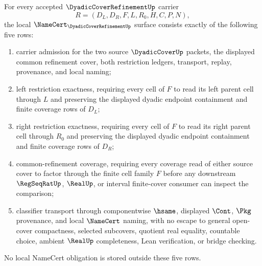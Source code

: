 \begin{theorem}
\label{thm:dyadic-cover-refinement-namecert-obligations}
For every accepted $\DyadicCoverRefinementUp$ carrier
$$
R=(D_L,D_R,F,L,R_0,H,C,P,N),
$$
the local $\NameCert_{\DyadicCoverRefinementUp}$ surface consists exactly of the following five rows:
\begin{enumerate}
\item carrier admission for the two source $\DyadicCoverUp$ packets, the displayed common refinement cover, both restriction ledgers, transport, replay, provenance, and local naming;
\item left restriction exactness, requiring every cell of $F$ to read its left parent cell through $L$ and preserving the displayed dyadic endpoint containment and finite coverage rows of $D_L$;
\item right restriction exactness, requiring every cell of $F$ to read its right parent cell through $R_0$ and preserving the displayed dyadic endpoint containment and finite coverage rows of $D_R$;
\item common-refinement coverage, requiring every coverage read of either source cover to factor through the finite cell family $F$ before any downstream $\RegSeqRatUp$, $\RealUp$, or interval finite-cover consumer can inspect the comparison;
\item classifier transport through componentwise $\hsame$, displayed $\Cont$, $\Pkg$ provenance, and local $\NameCert$ naming, with no escape to general open-cover compactness, selected subcovers, quotient real equality, countable choice, ambient $\RealUp$ completeness, Lean verification, or bridge checking.
\end{enumerate}
No local NameCert obligation is stored outside these five rows.
\end{theorem}
